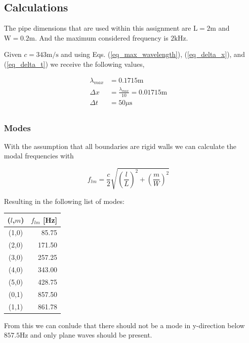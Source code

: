 \documentclass[twocolumn]{article}
\begin{document}
\subsection{Calculations}
The pipe dimensions that are used within this assignment are $\text{L}=2\text{m}$
and $\text{W}=0.2\text{m}$.
And the maximum considered frequency is $2 \text{kHz}$.

Given $c=343\text{m/s}$ and using Eqs. (\ref{eq_max_wavelength}), (\ref{eq_delta_x}),
and (\ref{eq_delta_t}) we receive the following values,

\begin{equation}
\begin{aligned}
    \lambda_{max} &= 0.1715\text{m} \\
    \Delta x &= \frac{\lambda_{max}}{10} = 0.01715\text{m} \\
    \Delta t &= 50\mu\text{s} \\
\end{aligned}
\end{equation}

\subsubsection{Modes}
With the assumption that all boundaries are rigid walls we can calculate the modal
frequencies \cite{CavitiesWaveguides} with

\begin{equation}
    f_{lm} = \frac{c}{2}\sqrt{\left(\frac{l}{L}\right)^2 + \left(\frac{m}{W}\right)^2}
\end{equation}

Resulting in the following list of modes:

\begin{center}
\begin{tabular}{c|r}
    ($l$,$m$) & $f_{lm}$ [Hz] \\
    \hline
    (1,0) & 85.75 \\
    (2,0) & 171.50 \\
    (3,0) & 257.25 \\
    (4,0) & 343.00 \\
    (5,0) & 428.75 \\
    (0,1) & 857.50 \\
    (1,1) & 861.78 \\
\end{tabular}
\end{center}

From this we can conlude that there should not be a mode in y-direction below $857.5\text{Hz}$
and only plane waves should be present.
\end{document}
